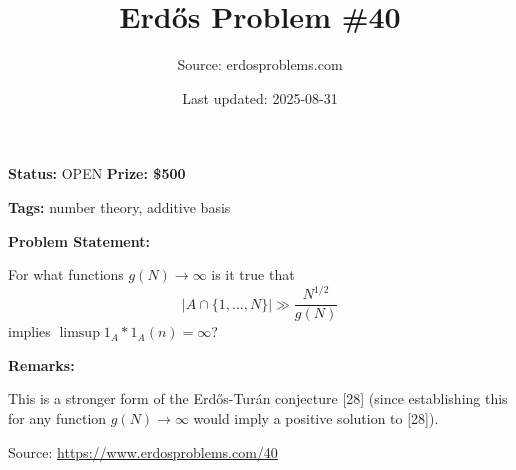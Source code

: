 \documentclass{article}
\title{Erd\H{o}s Problem \#40}
\date{Last updated: 2025-08-31}
\author{Source: erdosproblems.com}
\begin{document}
\maketitle

\noindent\textbf{Status:} OPEN \quad \textbf{Prize: \$500}

\noindent\textbf{Tags:} number theory, additive basis

\medskip
\noindent\textbf{Problem Statement:}

For what functions $g(N)\to \infty$ is it true that\[\lvert A\cap \{1,\ldots,N\}\rvert \gg \frac{N^{1/2}}{g(N)}\]implies $\limsup 1_A\ast 1_A(n)=\infty$?

\bigskip
\noindent\textbf{Remarks:}

This is a stronger form of the Erd\H{o}s-Tur\'{a}n conjecture [28] (since establishing this for any function $g(N)\to \infty$ would imply a positive solution to [28]).

\bigskip
\noindent\small{Source: \url{https://www.erdosproblems.com/40}}
\end{document}
